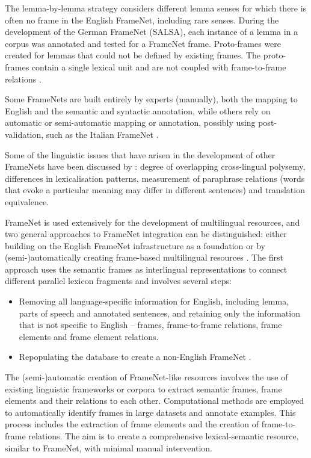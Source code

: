 \documentclass[output=paper,colorlinks,citecolor=brown]{langscibook}
\begin{document}
The lemma-by-lemma strategy considers different lemma senses for which there is often no frame in the English FrameNet, including rare senses. During the development of the German FrameNet (SALSA), each instance of a lemma in a corpus was annotated and tested for a FrameNet frame. Proto-frames were created for lemmas that could not be defined by existing frames. The proto-frames contain a single lexical unit and are not coupled with frame-to-frame relations \citep[213]{aljoscha2009}.

Some FrameNets are built entirely by experts (manually), both the mapping to English and the semantic and syntactic annotation, while others rely on automatic or semi-automatic mapping or annotation, possibly using post-validation, such as the Italian FrameNet \citep{lenci-etal-2010-building}.

Some of the linguistic issues that have arisen in the development of other FrameNets have been discussed by \citet{boas2009multilingual}: degree of overlapping cross-lingual polysemy, differences in lexicalisation patterns, measurement of paraphrase relations (words that evoke a particular meaning may differ in different sentences) and translation equivalence.

FrameNet is used extensively for the development of multilingual resources, and two general approaches to FrameNet integration can be distinguished: either building on the English FrameNet infrastructure as a foundation \citep{Boas+2009+59-100,Rggeberg2003SurpriseSF} or by (semi-)automatically creating frame-based multilingual resources \citep{10.1007/978-3-319-41552-9_35,torrent-etal-2014-copa}. The first approach uses the semantic frames as interlingual representations to connect different parallel lexicon fragments and involves several steps:

\begin{itemize}
\item Removing all language-specific information for English, including lemma, parts of speech and annotated sentences, and retaining only the information that is not specific to English -- frames, frame-to-frame relations, frame elements and frame element relations.
\item Repopulating the database to create a non-English FrameNet \citep[72]{Boas+2009+59-100}.
\end{itemize}

The (semi-)automatic creation of FrameNet-like resources involves the use of existing linguistic frameworks or corpora to extract semantic frames, frame elements and their relations to each other. Computational methods are employed to automatically identify frames in large datasets and annotate examples. This process includes the extraction of frame elements and the creation of frame-to-frame relations. The aim is to create a comprehensive lexical-semantic resource, similar to FrameNet, with minimal manual intervention.
\end{document}

